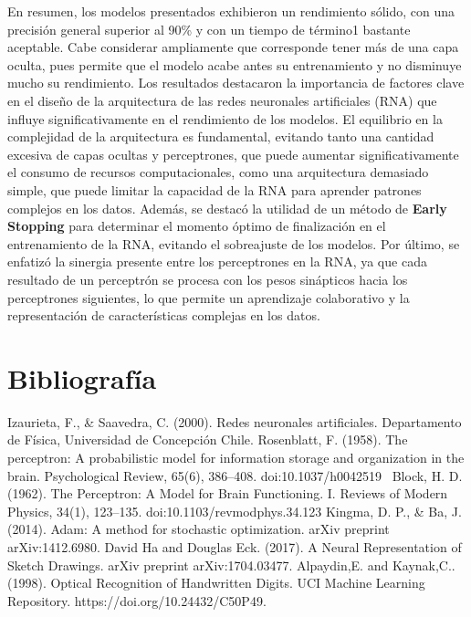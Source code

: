 \documentclass[journal]{IEEEtai}
\begin{document}
En resumen, los modelos presentados exhibieron un rendimiento sólido, con una precisión general superior al 90\% y con un tiempo de término1 bastante aceptable. Cabe considerar ampliamente que corresponde tener más de una capa oculta, pues permite que el modelo acabe antes su entrenamiento y no disminuye mucho su rendimiento. Los resultados destacaron la importancia de factores clave en el diseño de la arquitectura de las redes neuronales artificiales (RNA) que influye significativamente en el rendimiento de los modelos. El equilibrio en la complejidad de la arquitectura es fundamental, evitando tanto una cantidad excesiva de capas ocultas y perceptrones, que puede aumentar significativamente el consumo de recursos computacionales, como una arquitectura demasiado simple, que puede limitar la capacidad de la RNA para aprender patrones complejos en los datos.
Además, se destacó la utilidad de un método de \textbf{Early Stopping} para determinar el momento óptimo de finalización en el entrenamiento de la RNA, evitando el sobreajuste de los modelos.
Por último, se enfatizó la sinergia presente entre los perceptrones en la RNA, ya que cada resultado de un perceptrón se procesa con los pesos sinápticos hacia los perceptrones siguientes, lo que permite un aprendizaje colaborativo y la representación de características complejas en los datos.

\section*{Bibliografía}
\def\refname{}
\begin{thebibliography}{34}
	 Izaurieta, F., \& Saavedra, C. (2000). Redes neuronales artificiales. Departamento de Física, Universidad de Concepción Chile.
	 Rosenblatt, F. (1958). The perceptron: A probabilistic model for information storage and organization in the brain. Psychological Review, 65(6), 386–408. doi:10.1037/h0042519 
	 Block, H. D. (1962). The Perceptron: A Model for Brain Functioning. I. Reviews of Modern Physics, 34(1), 123–135. doi:10.1103/revmodphys.34.123
	 Kingma, D. P., \& Ba, J. (2014). Adam: A method for stochastic optimization. arXiv preprint arXiv:1412.6980.
	 David Ha and Douglas Eck. (2017). A Neural Representation of Sketch Drawings. arXiv preprint arXiv:1704.03477.
	 Alpaydin,E. and Kaynak,C.. (1998). Optical Recognition of Handwritten Digits. UCI Machine Learning Repository. https://doi.org/10.24432/C50P49.
\end{thebibliography}
\end{document}
